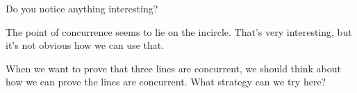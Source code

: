 Do you notice anything interesting?
















The point of concurrence seems to lie on the incircle. That's very interesting, but it's not obvious how we can use that.

When we want to prove that three lines are concurrent, we should think about how we can prove the lines are concurrent. What strategy can we try here?

